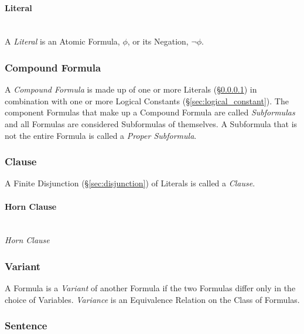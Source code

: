 \paragraph{Literal}\label{sec:literal}\hfill \\

A \emph{Literal} is an Atomic Formula, $\phi$, or its Negation, $\neg
\phi$.



\subsubsection{Compound Formula}\label{sec:compound_formula}

A \emph{Compound Formula} is made up of one or more Literals
(\S\ref{sec:literal}) in combination with one or more Logical
Constants (\S\ref{sec:logical_constant}). The component Formulas that
make up a Compound Formula are called \emph{Subformulas} and all
Formulas are considered Subformulas of themselves. A Subformula that
is not the entire Formula is called a \emph{Proper Subformula}.



\subsubsection{Clause}\label{sec:clause}

A Finite Disjunction (\S\ref{sec:disjunction}) of Literals is called a
\emph{Clause}.



\paragraph{Horn Clause}\label{sec:horn_clause}\hfill \\

\emph{Horn Clause}



\subsubsection{Variant}\label{sec:variant}

A Formula is a \emph{Variant} of another Formula if the two Formulas
differ only in the choice of Variables. \emph{Variance} is an
Equivalence Relation on the Class of Formulas.



\subsubsection{Sentence}\label{sec:sentence}

